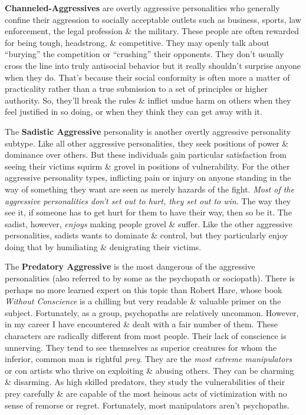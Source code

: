 \documentclass{article}
\numberwithin{equation}{section}
\begin{document}
\textbf{Channeled-Aggressives} are overtly aggressive personalities who generally confine their aggression to socially acceptable outlets such as business, sports, law enforcement, the legal profession \& the military. These people are often rewarded for being tough, headstrong, \& competitive. They may openly talk about ``burying'' the competition or ``crushing'' their opponents. They don't usually cross the line into truly antisocial behavior but it really shouldn't surprise anyone when they do. That's because their social conformity is often more a matter of practicality rather than a true submission to a set of principles or higher authority. So, they'll break the rules \& inflict undue harm on others when they feel justified in so doing, or when they think they can get away with it.

The \textbf{Sadistic Aggressive} personality is another overtly aggressive personality subtype. Like all other aggressive personalities, they seek positions of power \& dominance over others. But these individuals gain particular satisfaction from seeing their victims squirm \& grovel in positions of vulnerability. For the other aggressive personality types, inflicting pain or injury on anyone standing in the way of something they want are seen as merely hazards of the fight. \textit{Most of the aggressive personalities don't set out to hurt, they set out to win}. The way they see it, if someone has to get hurt for them to have their way, then so be it. The sadist, however, \textit{enjoys} making people grovel \& suffer. Like the other aggressive personalities, sadists wants to dominate \& control, but they particularly enjoy doing that by humiliating \& denigrating their victims.

The \textbf{Predatory Aggressive} is the most dangerous of the aggressive personalities (also referred to by some as the psychopath or sociopath). There is perhaps no more learned expert on this topic than Robert Hare, whose book \textit{Without Conscience} is a chilling but very readable \& valuable primer on the subject. Fortunately, as a group, psychopaths are relatively uncommon. However, in my career I have encountered \& dealt with a fair number of them. These characters are radically different from most people. Their lack of conscience is unnerving. They tend to see themselves as superior creatures for whom the inferior, common man is rightful \textit{prey}. They are the \textit{most extreme manipulators} or con artists who thrive on exploiting \& abusing others. They can be charming \& disarming. As high skilled predators, they study the vulnerabilities of their prey carefully \& are capable of the most heinous acts of victimization with no sense of remorse or regret. Fortunately, most manipulators aren't psychopaths.
\end{document}
